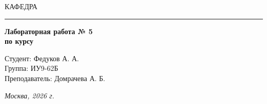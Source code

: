 \begin{titlepage}
  \vspace{0.5ex}
  \hspace{-35pt} \noindent \small КАФЕДРА\hspace{50pt} 

  \vspace*{-16pt}
  \hspace{30pt}\rule{0.866\textwidth}{0.4pt}

  \vspace{11em}

  \begin{center}
    \Large {\bf Лабораторная работа № 5} \\
    \large {\bf по курсу } \\
    \large {}

  \end{center}\normalsize

  \vspace{8em}

  \begin{flushright}
    \begin{minipage}{0.5\linewidth}
      {Студент: Федуков А. А. \hspace*{15pt}\\
        Группа: ИУ9-62Б \\
        Преподаватель: Домрачева А. Б.\hspace*{15pt}}
    \end{minipage}
  \end{flushright}
  \bigskip
  \vfill

  \begin{center}
    \textsl{Москва, 2026 г.}
  \end{center}
\end{titlepage}
